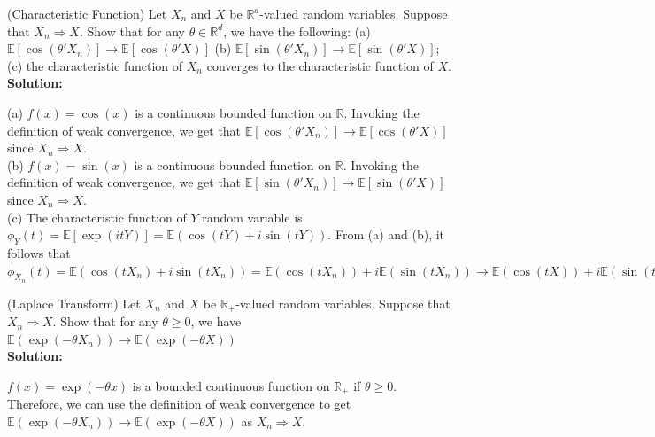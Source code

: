 \documentclass[11pt,letterpaper]{article}                  %
\begin{document}
\begin{problem} (Characteristic Function) Let $X_n$ and $X$ be $\mathbb{R}^d$-valued random variables. Suppose that $X_n \Rightarrow X$. Show that for any $\theta \in \mathbb{R}^d$, we have the following:
	(a) $\mathbb{E}\left[\cos(\theta' X_n)\right] \rightarrow \mathbb{E}[\cos(\theta' X)]$
	(b) $\mathbb{E}[\sin(\theta' X_n)] \rightarrow \mathbb{E}[\sin(\theta' X)]$;
	(c) the characteristic function of $X_n$ converges to the characteristic function of $X$. \\
	
\textbf{Solution:} 

(a) 	$f(x) = \cos(x)$ is a continuous bounded function on $\mathbb{R}$. Invoking the definition of weak convergence, we get that $\mathbb{E}\left[\cos(\theta' X_n)\right] \rightarrow \mathbb{E}[\cos(\theta' X)]$ since $X_n \Rightarrow X$. \\
	
(b) 	$f(x) = \sin(x)$ is a continuous bounded function on $\mathbb{R}$. Invoking the definition of weak convergence, we get that $\mathbb{E}[\sin(\theta' X_n)] \rightarrow \mathbb{E}[\sin(\theta' X)]$ since $X_n \Rightarrow X$. \\

(c) The characteristic function of $Y$ random variable is $\phi_{Y}(t) = \mathbb{E}\left[\exp(itY)\right] = \mathbb{E}(\cos(tY) + i \sin(tY))$. From (a) and (b), it follows that  $\phi_{X_n}(t) =  \mathbb{E}(\cos(tX_n) + i \sin(tX_n)) = \mathbb{E}(\cos(tX_n)) + i \mathbb{E}(\sin(tX_n)) \rightarrow \mathbb{E}(\cos(tX)) + i \mathbb{E}(\sin(tX)) = \phi_{X}(t).$

\end{problem}

\bigskip

\begin{problem}(Laplace Transform) Let $X_n$ and $X$ be $\mathbb{R}_{+}$-valued random variables. Suppose that $X_n \Rightarrow X$. Show that for any $\theta \geq 0$, we have $\mathbb{E}(\exp(-\theta X_n)) \rightarrow \mathbb{E}(\exp(-\theta X))$ \\
	
\textbf{Solution:} 

$f(x) = \exp(-\theta x)$ is a bounded continuous function on $\mathbb{R}_{+}$ if $\theta \geq 0$. Therefore, we can use the definition of weak convergence to get $\mathbb{E}(\exp(-\theta X_n)) \rightarrow \mathbb{E}(\exp(-\theta X))$ as   $X_n \Rightarrow X$.

\end{problem}
\end{document}
